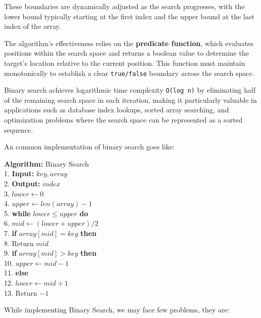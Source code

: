 \documentclass[10pt,twocolumn]{article}
\begin{document}
		These boundaries are dynamically adjusted as the search progresses, with the lower bound typically starting at the first index and the upper bound at the last index of the array.
		
		
		The algorithm's effectiveness relies on the \textbf{predicate function}, which evaluates positions within the search space and returns a boolean value to determine the target's location relative to the current position. This function must maintain monotonically to establish a clear \texttt{true/false} boundary across the search space.
		
	 	Binary search achieves logarithmic time complexity \texttt{O(log n)} by eliminating half of the remaining search space in each iteration, making it particularly valuable in applications such as database index lookups, sorted array searching, and optimization problems where the search space can be represented as a sorted sequence.
	 	
	 	An common implementation of binary search goes like:
	 	
	 	\vspace{10pt}
	 	
	 	\noindent
	 	\textbf{Algorithm:} Binary Search\\
	 	1. \textbf{Input:} \(key, array\) \\
	 	2. \textbf{Output:} \(index\) \\
	 	3. \(lower \gets 0\) \\
	 	4. \(upper \gets len(array) - 1\) \\
	 	5. \textbf{while} \(lower \leq upper\) \textbf{ do} \\
	 	6. \quad\(mid \gets (lower + upper) / 2\) \\
	 	7. \quad \textbf{if} \(array[mid] = key \) \textbf{ then} \\
	 	8. \quad \quad Return \(mid\) \\
	 	9. \quad \textbf{if} \(array[mid] > key \) \textbf{ then} \\
	 	10. \quad \quad \(upper \gets mid - 1\) \\
	 	11. \quad \textbf{else} \\
	 	12. \quad \quad \(lower \gets mid + 1\) \\
	 	13. Return \(-1\)
	 	
	 	\vspace{10pt}
		
		While implementing Binary Search, we may face few problems, they are:
	
\end{document}
